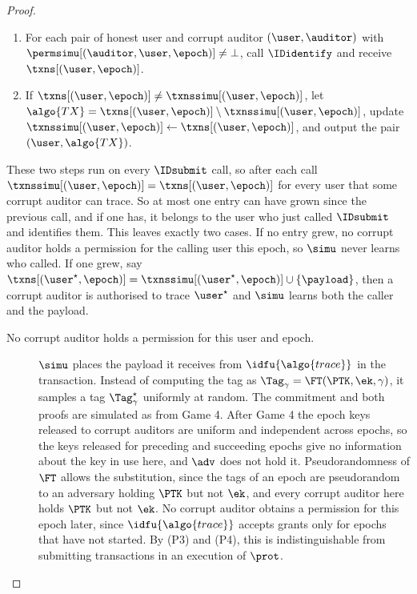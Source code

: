 \begin{proof}
\begin{enumerate}
    \item For each pair of honest user and corrupt auditor $(\user, \auditor)$
with $\permsimu[(\auditor,\user,\epoch)]\neq \bot$, \linebreak call $\IDidentify$ and
receive $\txns[(\user,\epoch)]$.

    \item If $\txns[(\user,\epoch)] \neq \txnssimu[(\user, \epoch)]$, let
$\algo{TX} = \txns[(\user,\epoch)] \setminus \txnssimu[(\user, \epoch)]$, update
$\txnssimu[(\user, \epoch)] \leftarrow \txns[(\user, \epoch)]$, and output the
pair $(\user, \algo{TX})$.

  \end{enumerate}

  These two steps run on every $\IDsubmit$ call, so after each call
$\txnssimu[(\user,\epoch)] = \txns[(\user,\epoch)]$ for every user that some
corrupt auditor can trace. So at most one entry can have grown since the
previous call, and if one has, it belongs to the user who just called
$\IDsubmit$ and identifies them. This leaves exactly two cases. If no entry
grew, no corrupt auditor holds a permission for the calling user this epoch, so
$\simu$ never learns who called. If one grew, say $\txns[(\user^\star,\epoch)] =
\txnssimu[(\user^\star,\epoch)] \cup \{\payload\}$, then a corrupt auditor is
authorised to trace $\user^\star$ and $\simu$ learns both the caller and the
payload.

  \begin{description}

    \item[No corrupt auditor holds a permission for this user and epoch.]
$\simu$ places the payload it receives from $\idfu{\algo{trace}}$ in the
transaction. Instead of computing the tag as $\Tag_\gamma =
\FT(\PTK,\ek,\gamma)$, it samples a tag $\Tag_{\gamma}^\star$ uniformly at
random. The commitment and both proofs are simulated as from Game 4. After Game 4 the epoch keys released to corrupt auditors
are uniform and independent across epochs, so the keys released for preceding
and succeeding epochs give no information about the key in use here, and
$\adv$ does not hold it. Pseudorandomness of $\FT$ allows the substitution,
since the tags of an epoch are pseudorandom to an adversary holding $\PTK$ but
not $\ek$, and every corrupt auditor here holds $\PTK$ but not $\ek$. No
corrupt auditor obtains a permission for this epoch later, since
$\idfu{\algo{trace}}$ accepts grants only for epochs that have not started. By
(P3) and (P4), this is indistinguishable from submitting transactions in an
execution of $\prot$.


\end{description}
\end{proof}
